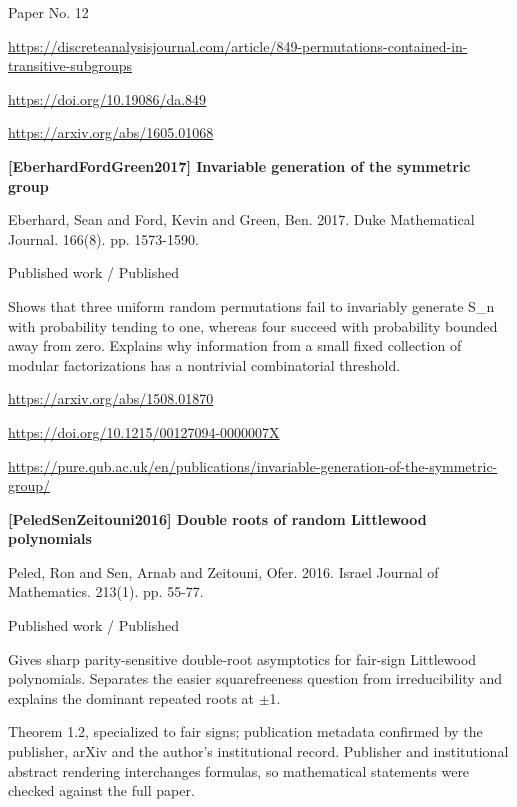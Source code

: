 \documentclass[11pt,a4paper,oneside,openany]{book}
\begin{document}
{\small Paper No. 12}\par
{\footnotesize\url{https://discreteanalysisjournal.com/article/849-permutations-contained-in-transitive-subgroups}}\par
{\footnotesize\url{https://doi.org/10.19086/da.849}}\par
{\footnotesize\url{https://arxiv.org/abs/1605.01068}}\par
\vspace{9pt}
\hypertarget{ref:EberhardFordGreen2017}{}
{\sffamily\bfseries\color{atlasgreen}[EberhardFordGreen2017] Invariable generation of the symmetric group}\par
\color{black} Eberhard, Sean and Ford, Kevin and Green, Ben. 2017. Duke Mathematical Journal. 166(8). pp. 1573-1590.\par
{\small\sffamily\color{atlasgold}Published work / Published}\par
\color{black} Shows that three uniform random permutations fail to invariably generate S\_\allowbreak{}n with probability tending to one, whereas four succeed with probability bounded away from zero. Explains why information from a small fixed collection of modular factorizations has a nontrivial combinatorial threshold.\par
{\footnotesize\url{https://arxiv.org/abs/1508.01870}}\par
{\footnotesize\url{https://doi.org/10.1215/00127094-0000007X}}\par
{\footnotesize\url{https://pure.qub.ac.uk/en/publications/invariable-generation-of-the-symmetric-group/}}\par
\vspace{9pt}
\hypertarget{ref:PeledSenZeitouni2016}{}
{\sffamily\bfseries\color{atlasgreen}[PeledSenZeitouni2016] Double roots of random Littlewood polynomials}\par
\color{black} Peled, Ron and Sen, Arnab and Zeitouni, Ofer. 2016. Israel Journal of Mathematics. 213(1). pp. 55-77.\par
{\small\sffamily\color{atlasgold}Published work / Published}\par
\color{black} Gives sharp parity-sensitive double-root asymptotics for fair-sign Littlewood polynomials. Separates the easier squarefreeness question from irreducibility and explains the dominant repeated roots at \ensuremath{\pm}1.\par
{\small Theorem 1.2, specialized to fair signs; publication metadata confirmed by the publisher, arXiv and the author's institutional record. Publisher and institutional abstract rendering interchanges formulas, so mathematical statements were checked against the full paper.}\par
\end{document}
